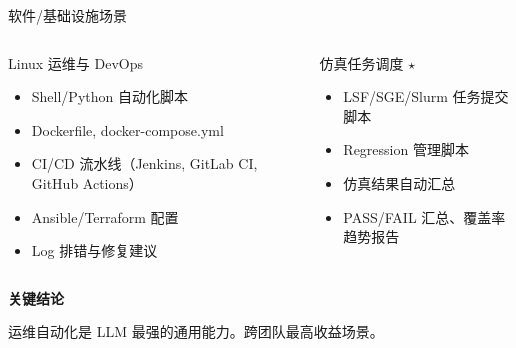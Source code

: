 \documentclass[UTF8,11pt,aspectratio=169]{beamer}
\newenvironment{keypoint}{
  \begin{block}{\textbf{关键结论}}
}{
  \end{block}
}
\begin{document}
\begin{frame}{软件/基础设施场景}
  \begin{columns}[T]
    \begin{block}{Linux 运维与 DevOps }
      \begin{itemize}
        \item Shell/Python 自动化脚本
        \item Dockerfile, docker-compose.yml
        \item CI/CD 流水线（Jenkins, GitLab CI, GitHub Actions）
        \item Ansible/Terraform 配置
        \item Log 排错与修复建议
      \end{itemize}
    \end{block}

    \begin{block}{仿真任务调度 $\star$}
      \begin{itemize}
        \item LSF/SGE/Slurm 任务提交脚本
        \item Regression 管理脚本
        \item 仿真结果自动汇总
        \item PASS/FAIL 汇总、覆盖率趋势报告
      \end{itemize}
    \end{block}
  \end{columns}

  \vspace{0.5em}
  \begin{keypoint}
    运维自动化是 LLM 最强的通用能力。跨团队最高收益场景。
  \end{keypoint}
\end{frame}
\end{document}

